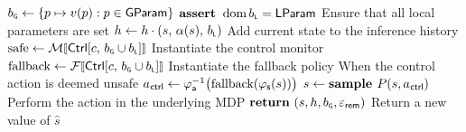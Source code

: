 \begin{algorithm}
\begin{algorithmic}[1]
      \State $b_\textsf{\tiny G} \gets \{p \mapsto v(p) : p \in \mathsf{GParam}\}$
      \State $\textbf{assert } \operatorname{\text{dom}} b_\textsf{\tiny L} = \mathsf{LParam}$ \Comment Ensure that all local parameters are set \label{line:assert-local}
      \State $h \gets h \cdot (s, \, \alpha(s), \, b_\textsf{\tiny L})$ \Comment Add current state to the inference history \label{line:inf-end}
      \State $\text{safe} \gets \CtrlMonitorSem{\CtrlWith{c, \,\GlobBounds \CatValuation \LocBounds}}$ \Comment Instantiate the control monitor \label{line:mon-start}
      \State $\text{fallback} \gets \CtrlFallbackSem{\CtrlWith{c, \,\GlobBounds \CatValuation \LocBounds}}$ \Comment Instantiate the fallback policy
       \Comment When the control action is deemed unsafe
        \State $a_{\mkern1mu\mathsf{ctrl}} \gets \varphi_{\mathsf{a}}^{-1}\bigl(\text{fallback}(\varphi_{\mathsf{s}}(s))\bigr)$  \label{line:mon-end} \label{line:fallback}
      \EndIf
      \State $s \gets \textbf{sample } P(s, a_{\mkern1mu\mathsf{ctrl}})$ \Comment Perform the action in the underlying MDP \label{line:perform-underlying}
      \State $\Return \  (s, h, \GlobBounds, \EpsRem)$ \Comment Return a new value of $\hat s$
    \EndProcedure
    \medskip
  \end{algorithmic}
\end{algorithm}

